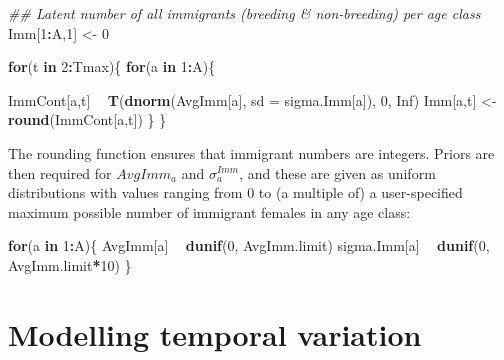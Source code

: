 \documentclass[
]{book}
\newenvironment{Shaded}{\begin{snugshade}}{\end{snugshade}}
\newcommand{\CommentTok}[1]{\textcolor[rgb]{0.56,0.35,0.01}{\textit{#1}}}
\newcommand{\ControlFlowTok}[1]{\textcolor[rgb]{0.13,0.29,0.53}{\textbf{#1}}}
\newcommand{\DataTypeTok}[1]{\textcolor[rgb]{0.13,0.29,0.53}{#1}}
\newcommand{\DecValTok}[1]{\textcolor[rgb]{0.00,0.00,0.81}{#1}}
\newcommand{\KeywordTok}[1]{\textcolor[rgb]{0.13,0.29,0.53}{\textbf{#1}}}
\newcommand{\NormalTok}[1]{#1}
\newcommand{\OperatorTok}[1]{\textcolor[rgb]{0.81,0.36,0.00}{\textbf{#1}}}
\newcommand{\OtherTok}[1]{\textcolor[rgb]{0.56,0.35,0.01}{#1}}
\newcommand{\StringTok}[1]{\textcolor[rgb]{0.31,0.60,0.02}{#1}}
\begin{document}
\begin{Shaded}
\begin{Highlighting}[]
\CommentTok{## Latent number of all immigrants (breeding & non-breeding) per age class}
\NormalTok{Imm[}\DecValTok{1}\OperatorTok{:}\NormalTok{A,}\DecValTok{1}\NormalTok{] <-}\StringTok{ }\DecValTok{0}

\ControlFlowTok{for}\NormalTok{(t }\ControlFlowTok{in} \DecValTok{2}\OperatorTok{:}\NormalTok{Tmax)\{}
  \ControlFlowTok{for}\NormalTok{(a }\ControlFlowTok{in} \DecValTok{1}\OperatorTok{:}\NormalTok{A)\{}

\NormalTok{    ImmCont[a,t] }\OperatorTok{~}\StringTok{ }\KeywordTok{T}\NormalTok{(}\KeywordTok{dnorm}\NormalTok{(AvgImm[a], }\DataTypeTok{sd =}\NormalTok{ sigma.Imm[a]), }\DecValTok{0}\NormalTok{, }\OtherTok{Inf}\NormalTok{)}
\NormalTok{    Imm[a,t] <-}\StringTok{ }\KeywordTok{round}\NormalTok{(ImmCont[a,t])}
\NormalTok{  \}}
\NormalTok{\}}
\end{Highlighting}
\end{Shaded}

The rounding function ensures that immigrant numbers are integers.
Priors are then required for \(AvgImm_a\) and \(\sigma_a^{Imm}\), and these are
given as uniform distributions with values ranging from 0 to (a multiple of) a
user-specified maximum possible number of immigrant females in any age class:

\begin{Shaded}
\begin{Highlighting}[]
\ControlFlowTok{for}\NormalTok{(a }\ControlFlowTok{in} \DecValTok{1}\OperatorTok{:}\NormalTok{A)\{}
\NormalTok{  AvgImm[a] }\OperatorTok{~}\StringTok{ }\KeywordTok{dunif}\NormalTok{(}\DecValTok{0}\NormalTok{, AvgImm.limit)}
\NormalTok{  sigma.Imm[a] }\OperatorTok{~}\StringTok{ }\KeywordTok{dunif}\NormalTok{(}\DecValTok{0}\NormalTok{, AvgImm.limit}\OperatorTok{*}\DecValTok{10}\NormalTok{)}
\NormalTok{\}}
\end{Highlighting}
\end{Shaded}

\hypertarget{TempVar}{%
\chapter{Modelling temporal variation}\label{TempVar}}
\end{document}

